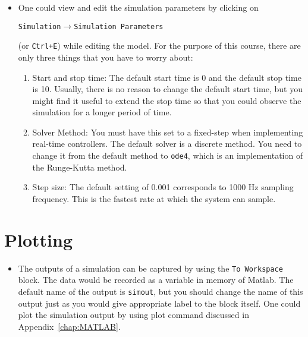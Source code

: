 \begin{itemize}
    \item One could view and edit the simulation parameters by clicking on
          \begin{center}
              \verb|Simulation|\(\to \)\verb|Simulation Parameters|
          \end{center}
          (or \verb|Ctrl+E|) while editing the model.  For the purpose of this course,
          there are only three things that you have to worry about:
          \begin{enumerate}
              \item Start and stop time: The default start time is 0 and the default stop
                    time is 10.  Usually, there is no reason to change the default start time,
                    but you might find it useful to extend the stop time so that you could
                    observe the simulation for a longer period of time.

              \item Solver Method: You must have this set to a fixed-step when implementing
                    real-time controllers. The default solver is a discrete method. You need to
                    change it from the default method to \verb|ode4|, which is an implementation
                    of the Runge-Kutta method.

              \item Step size: The default setting of 0.001 corresponds to 1000 Hz sampling
                    frequency.  This is the fastest rate at which the system can sample.
          \end{enumerate}
\end{itemize}

\section{Plotting}

\begin{itemize}
    \item The outputs of a simulation can be captured by using the
          \verb|To Workspace| block.  The data would be recorded as a variable in
          memory of \textsf{Matlab}.  The default name of the output is \verb|simout|,
          but you should change the name of this output just as you would give
          appropriate label to the block itself.  One could plot the simulation output
          by using plot command discussed in Appendix~\ref{chap:MATLAB}\@.
\end{itemize}

